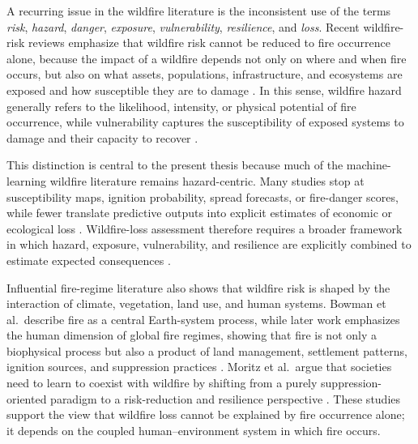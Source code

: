 A recurring issue in the wildfire literature is the inconsistent use of the terms \emph{risk}, \emph{hazard}, \emph{danger}, \emph{exposure}, \emph{vulnerability}, \emph{resilience}, and \emph{loss}. Recent wildfire-risk reviews emphasize that wildfire risk cannot be reduced to fire occurrence alone, because the impact of a wildfire depends not only on where and when fire occurs, but also on what assets, populations, infrastructure, and ecosystems are exposed and how susceptible they are to damage \citep{xu2024survey,xu2025deeplearning,jodhani2026ai,caron2025ai,ejaz2025mlpipeline}. In this sense, wildfire hazard generally refers to the likelihood, intensity, or physical potential of fire occurrence, while vulnerability captures the susceptibility of exposed systems to damage and their capacity to recover \citep{arrogantefunes2024ecological,asif2026supranational}.

This distinction is central to the present thesis because much of the machine-learning wildfire literature remains hazard-centric. Many studies stop at susceptibility maps, ignition probability, spread forecasts, or fire-danger scores, while fewer translate predictive outputs into explicit estimates of economic or ecological loss \citep{asif2026supranational,caron2025ai}. Wildfire-loss assessment therefore requires a broader framework in which hazard, exposure, vulnerability, and resilience are explicitly combined to estimate expected consequences \citep{asif2026supranational,ma2022supplychain,monge2023probabilistic,thompson2011risk,calkin2014risk}.

Influential fire-regime literature also shows that wildfire risk is shaped by the interaction of climate, vegetation, land use, and human systems. Bowman et al.\ describe fire as a central Earth-system process, while later work emphasizes the human dimension of global fire regimes, showing that fire is not only a biophysical process but also a product of land management, settlement patterns, ignition sources, and suppression practices \citep{bowman2009fire,bowman2011human}. Moritz et al.\ argue that societies need to learn to coexist with wildfire by shifting from a purely suppression-oriented paradigm to a risk-reduction and resilience perspective \citep{moritz2014learning}. These studies support the view that wildfire loss cannot be explained by fire occurrence alone; it depends on the coupled human--environment system in which fire occurs.

